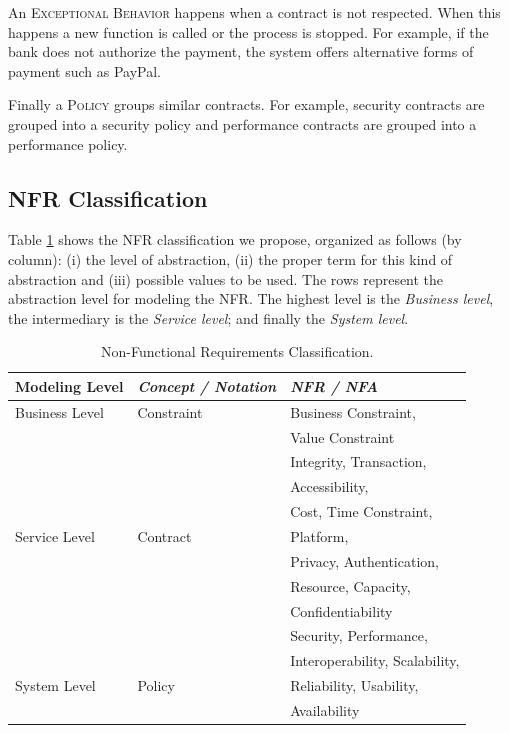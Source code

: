  
An \textsc{Exceptional Behavior} happens when a contract is not respected. When
this happens a new function is called or the process is stopped. For example, if
the bank does not authorize the payment, the system offers alternative forms
of payment such as PayPal.

Finally a \textsc{Policy} groups similar contracts. For example, security
contracts are grouped into a security policy and performance contracts are
grouped into a performance policy.


\subsection{NFR Classification}
\label{sec:nfr-classification}

Table \ref{tab:result04} shows the NFR classification we propose, organized
 as follows (by column): (i) the level of abstraction, (ii) the proper term for
 this kind of abstraction and (iii) possible values to be used. The rows
 represent the abstraction level for modeling the NFR. The highest level is the
 \textit{Business level}, the intermediary is the \textit{Service level}; and
 finally the \textit{System level}.  

\begin{table}[ht!]
\centering
\begin{tabular}{l|l|l}
  \hline 
  \hline
   \textbf{Modeling Level} & \textbf{\textit{Concept / Notation}} & \textbf{\textit{NFR / NFA}}  
   \\
  \hline
  \hline  
  Business Level & Constraint  & Business Constraint,    
 \\  
  &   & Value Constraint\\
  \hline   
   &  & Integrity, Transaction,  \\
   &  & Accessibility, \\
   &  & Cost, Time Constraint, \\
  Service Level & Contract & Platform, \\
   &  & Privacy, Authentication, \\
   &  & Resource, Capacity, \\
   &  &  Confidentiability 
   \\  \hline
   &  & Security, Performance,\\ 
   & & Interoperability, Scalability,\\
  System Level & Policy & Reliability, Usability,\\
   & & Availability\\
   \hline
  \hline  
\end{tabular}
\caption{Non-Functional Requirements Classification.}
\label{tab:result04}
\end{table} 



